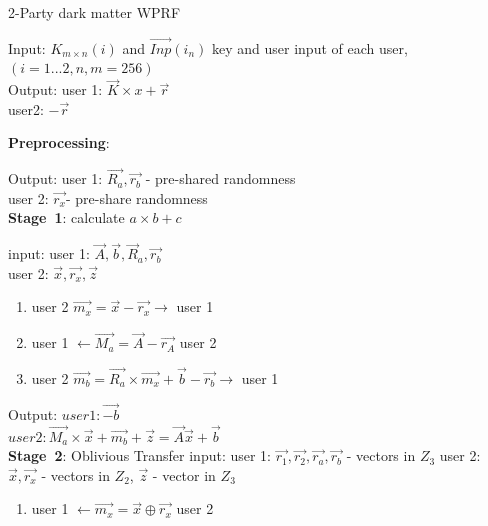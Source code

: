 \begin{algorithm}
	\caption{2-Party dark matter WPRF}
	\label{2PartyDarkMatter}
	
	
	Input: ${K_{m\times n} }(i)$ and $\vec{Inp}(i_n)$ key and user input of each user,\\
	$(i = 1...2, n,m = 256)$\\ 
	Output: user 1: $\vec{K} \times x + \vec{r}$\\
	user2: $-  \vec{r}$\\   %
	
	\begin{algorithmic}
		
		\STATE \textbf{Preprocessing}:
		
		Output: 	user 1: $\vec{R_a}, \vec{r_b}$ - pre-shared randomness \\
		user 2: $\vec{r_x} $- pre-share randomness \\
		
		\STATE  \textbf{Stage\ 1}: calculate $a \times b \plus c$
		
		input: user 1: ${\vec{A}, \vec{b}, {\vec R_a}, \vec{r_b} } $ \\
		user 2: ${\vec{x}, \vec{r_x},  \vec{z} }$ \\
		
		\begin{enumerate}
			
			\item user 2 $\vec{m_x} = \vec{x} -\vec{r_x}  \rightarrow  $  user 1
			
			\item user 1  $ \leftarrow   \vec{M_a} =  \vec{A} - \vec{r_A}   $ user 2
			
			\item user 2 $ \vec{m_b} = \vec{R_a} \times \vec{m_x} + \vec{b}  - \vec{r_b}  \rightarrow $ user 1
		\end{enumerate}
		
		Output: $user 1: \vec{- b} $  \\
		$user 2: \vec{M_a} \times \vec{x} + \vec{m_b} + \vec{z} = \vec{A} \vec{x} + \vec{b}$ \\
		
		\STATE  \textbf{Stage\ 2}: Oblivious Transfer
		input: 	 user 1:  $\vec{r_1}, \vec{r_2}, \vec{r_a}, \vec{r_b}$ - vectors in $Z_3$
		user 2:  $\vec{x}, \vec{r_x}$ - vectors in $Z_2$, $\vec{z} $ - vector in $Z_3$
		
		
		\begin{enumerate}
			\item user 1  $ \leftarrow   \vec{m_x} = \vec{x} \oplus \vec{r_x}$   user 2
			

\end{enumerate}
\end{algorithmic}
\end{algorithm}
